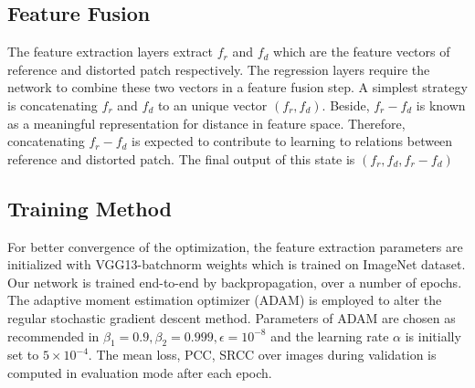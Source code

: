 \subsection{Feature Fusion}

The feature extraction layers extract $f_r$ and $f_d$ which are the feature vectors of reference and distorted patch respectively. The regression layers require the network to combine these two vectors in a feature fusion step. A simplest strategy is concatenating $f_r$ and $f_d$ to an unique vector $(f_r,f_d)$. Beside, $f_r-f_d$ is known as a meaningful representation for distance in feature space. Therefore, concatenating $f_r-f_d$ is expected to contribute to learning to relations between reference and distorted patch. The final output of this state is $(f_r,f_d,f_r-f_d)$

\subsection{Training Method}

For better convergence of the optimization, the feature extraction parameters are initialized with VGG13-batchnorm weights which is trained on ImageNet dataset. Our network is trained end-to-end by backpropagation, over a number of epochs. The adaptive moment estimation optimizer (ADAM) \cite{Kingma2015} is employed to alter the regular stochastic gradient descent method. Parameters of ADAM are chosen as recommended in \cite{Kingma2015} $\beta_1 = 0.9, \beta_2 = 0.999, \epsilon = 10^{-8}$ and the learning rate $\alpha$ is initially set to $5\times10^{-4}$. The mean loss, PCC, SRCC over images during validation is computed in evaluation mode after each epoch.